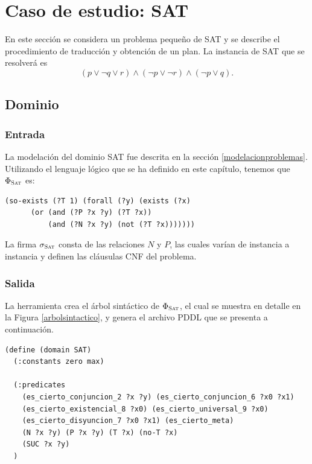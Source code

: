
\chapter{Caso de estudio: SAT}
\label{apendiceB}

En este sección se considera un problema pequeño de SAT y se describe el
procedimiento de traducción y obtención de un plan.
La instancia de SAT que se resolverá es
\begin{equation}
(p \lor \neg q \lor r) \land (\neg p \lor \neg r) \land (\neg p \lor q).
\end{equation}

\section{Dominio}
\subsection{Entrada}
La modelación del dominio SAT fue descrita en la sección
\ref{modelacionproblemas}. Utilizando el lenguaje lógico que se ha definido en
este capítulo, tenemos que $\Phi_{\textsc{Sat}}$ es:
\begin{verbatim}
(so-exists (?T 1) (forall (?y) (exists (?x)
      (or (and (?P ?x ?y) (?T ?x)) 
          (and (?N ?x ?y) (not (?T ?x)))))))
\end{verbatim}

La firma $\sigma_{\textsc{Sat}}$ consta de las relaciones $N$ y $P$, las cuales 
varían de instancia a instancia y definen las cláusulas CNF del problema.

\subsection{Salida}
La herramienta crea el árbol sintáctico de $\Phi_{\textsc{Sat}}$, el cual se muestra en
detalle en la Figura \ref{arbolsintactico}, y genera el archivo PDDL que se
presenta a continuación.

\begin{verbatim}
(define (domain SAT)
  (:constants zero max)

  (:predicates
    (es_cierto_conjuncion_2 ?x ?y) (es_cierto_conjuncion_6 ?x0 ?x1)
    (es_cierto_existencial_8 ?x0) (es_cierto_universal_9 ?x0)
    (es_cierto_disyuncion_7 ?x0 ?x1) (es_cierto_meta)
    (N ?x ?y) (P ?x ?y) (T ?x) (no-T ?x)
    (SUC ?x ?y)
  )
\end{verbatim}

